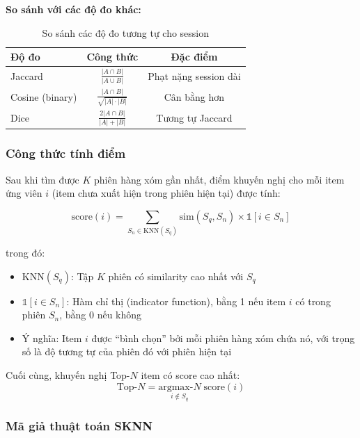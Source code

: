 \documentclass[12pt, a4paper]{article}
\begin{document}
\textbf{So sánh với các độ đo khác:}

\begin{table}[H]
\centering
\caption{So sánh các độ đo tương tự cho session}
\label{tab:sim_compare}
\begin{tabular}{lcc}
\toprule
\textbf{Độ đo} & \textbf{Công thức} & \textbf{Đặc điểm} \\
\midrule
Jaccard & $\frac{|A \cap B|}{|A \cup B|}$ & Phạt nặng session dài \\[0.3cm]
Cosine (binary) & $\frac{|A \cap B|}{\sqrt{|A| \cdot |B|}}$ & Cân bằng hơn \\[0.3cm]
Dice & $\frac{2|A \cap B|}{|A| + |B|}$ & Tương tự Jaccard \\
\bottomrule
\end{tabular}
\end{table}

\subsubsection{Công thức tính điểm}

Sau khi tìm được $K$ phiên hàng xóm gần nhất, điểm khuyến nghị cho mỗi item ứng viên $i$ (item chưa xuất hiện trong phiên hiện tại) được tính:

\begin{equation}
\boxed{
    \text{score}(i) = \sum_{S_n \in \text{KNN}(S_q)} \text{sim}(S_q, S_n) \times \mathbb{1}[i \in S_n]
}
\label{eq:sknn_score}
\end{equation}

trong đó:
\begin{itemize}
    \item $\text{KNN}(S_q)$: Tập $K$ phiên có similarity cao nhất với $S_q$
    \item $\mathbb{1}[i \in S_n]$: Hàm chỉ thị (indicator function), bằng 1 nếu item $i$ có trong phiên $S_n$, bằng 0 nếu không
    \item Ý nghĩa: Item $i$ được ``bình chọn'' bởi mỗi phiên hàng xóm chứa nó, với trọng số là độ tương tự của phiên đó với phiên hiện tại
\end{itemize}

Cuối cùng, khuyến nghị Top-$N$ item có score cao nhất:
\begin{equation}
    \text{Top-}N = \underset{i \notin S_q}{\text{argmax-}N} \; \text{score}(i)
    \label{eq:sknn_topn}
\end{equation}

\subsubsection{Mã giả thuật toán SKNN}
\end{document}
